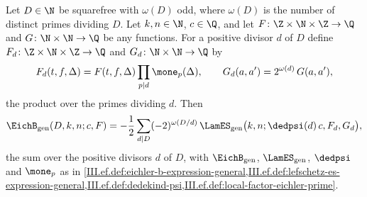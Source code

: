 Let $D\in\N$ be squarefree with $\omega(D)$ odd, where $\omega(D)$ is the number of distinct primes dividing $D$. Let $k,n\in\N$, $c\in\Q$, and
let $F\colon\Z\times\N\times\Z\to\Q$ and $G\colon\N\times\N\to\Q$ be any functions. For a positive divisor $d$ of $D$ define
$F_d\colon\Z\times\N\times\Z\to\Q$ and $G_d\colon\N\times\N\to\Q$ by
\[
  F_d(t,f,\Delta)=F(t,f,\Delta)\prod_{p\mid d}\mone_p(\Delta),\qquad G_d(a,a')=2^{\omega(d)}\,G(a,a'),
\]
the product over the primes dividing $d$. Then
\[
  \EichB_{\mathrm{gen}}(D,k,n;c,F)=-\frac12\sum_{d\mid D}(-2)^{\omega(D/d)}\,\LamES_{\mathrm{gen}}\bigl(k,n;\dedpsi(d)\,c,F_d,G_d\bigr),
\]
the sum over the positive divisors $d$ of $D$, with $\EichB_{\mathrm{gen}}$, $\LamES_{\mathrm{gen}}$, $\dedpsi$ and $\mone_p$ as in
\cref{III.ef.def:eichler-b-expression-general,III.ef.def:lefschetz-es-expression-general,III.ef.def:dedekind-psi,III.ef.def:local-factor-eichler-prime}.
